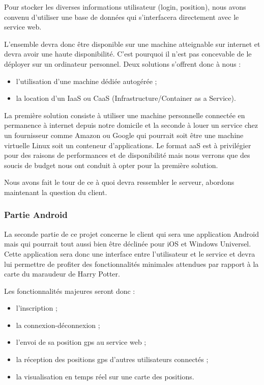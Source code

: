 Pour stocker les diverses informations utilisateur (login, position), nous avons convenu d'utiliser une base de données qui s'interfacera directement avec le service web.

L’ensemble devra donc être disponible sur une machine atteignable sur internet et devra avoir une haute disponibilité. C’est pourquoi il n’est pas concevable de le déployer sur un ordinateur personnel. Deux solutions s’offrent donc à nous :

\begin{itemize}
    \item l’utilisation d’une machine dédiée autogérée ;
    \item la location d’un IaaS ou CaaS (Infrastructure/Container as a Service).
\end{itemize}

La première solution consiste à utiliser une machine personnelle connectée en permanence à internet depuis notre domicile et la seconde à louer un service chez un fournisseur comme Amazon ou Google qui pourrait soit être une machine virtuelle Linux soit un conteneur d’applications. Le format aaS est à privilégier pour des raisons de performances et de disponibilité mais nous verrons que des soucis de budget nous ont conduit à opter pour la première solution.

Nous avons fait le tour de ce à quoi devra ressembler le serveur, abordons maintenant la question du client.

\subsubsection{Partie Android}

La seconde partie de ce projet concerne le client qui sera une application Android mais qui pourrait tout aussi bien être déclinée pour iOS et Windows Universel. Cette application sera donc une interface entre l’utilisateur et le service et devra lui permettre de profiter des fonctionnalités minimales attendues par rapport à la carte du maraudeur de Harry Potter.

Les fonctionnalités majeures seront donc :
\begin{itemize}
    \item l’inscription ;
    \item la connexion-déconnexion ;
    \item l’envoi de sa position gps au service web ;
    \item la réception des positions gps d'autres utilisateurs connectés ;
    \item la visualisation en temps réel sur une carte des positions.
\end{itemize}

